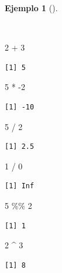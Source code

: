 \documentclass[
  a4paper,
]{scrreport}
\newenvironment{Shaded}{\begin{snugshade}}{\end{snugshade}}
\newcommand{\DecValTok}[1]{\textcolor[rgb]{0.68,0.00,0.00}{#1}}
\newcommand{\SpecialCharTok}[1]{\textcolor[rgb]{0.37,0.37,0.37}{#1}}
\theoremstyle{definition}
\theoremstyle{definition}
\newtheorem{example}{Ejemplo}[chapter]
\theoremstyle{remark}
\begin{document}
\begin{example}[]\protect\hypertarget{exm-operadores-aritmeticos}{}\label{exm-operadores-aritmeticos}

~

\begin{Shaded}
\begin{Highlighting}[]
\DecValTok{2} \SpecialCharTok{+} \DecValTok{3}
\end{Highlighting}
\end{Shaded}

\begin{verbatim}
[1] 5
\end{verbatim}

\begin{Shaded}
\begin{Highlighting}[]
\DecValTok{5} \SpecialCharTok{*} \SpecialCharTok{{-}}\DecValTok{2}
\end{Highlighting}
\end{Shaded}

\begin{verbatim}
[1] -10
\end{verbatim}

\begin{Shaded}
\begin{Highlighting}[]
\DecValTok{5} \SpecialCharTok{/} \DecValTok{2}
\end{Highlighting}
\end{Shaded}

\begin{verbatim}
[1] 2.5
\end{verbatim}

\begin{Shaded}
\begin{Highlighting}[]
\DecValTok{1} \SpecialCharTok{/} \DecValTok{0}
\end{Highlighting}
\end{Shaded}

\begin{verbatim}
[1] Inf
\end{verbatim}

\begin{Shaded}
\begin{Highlighting}[]
\DecValTok{5} \SpecialCharTok{\%\%} \DecValTok{2}
\end{Highlighting}
\end{Shaded}

\begin{verbatim}
[1] 1
\end{verbatim}

\begin{Shaded}
\begin{Highlighting}[]
\DecValTok{2} \SpecialCharTok{\^{}} \DecValTok{3}
\end{Highlighting}
\end{Shaded}

\begin{verbatim}
[1] 8
\end{verbatim}

\end{example}
\end{document}
